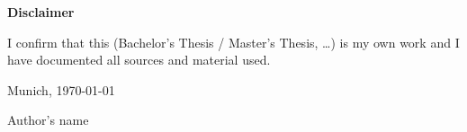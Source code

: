 \cleardoublepage{}

\thispagestyle{empty}

\vspace*{0.5\textheight}
\noindent

\makeatletter

\begin{center}
    {\textbf{Disclaimer}}
\end{center}

\begin{flushleft}
    {I confirm that this (Bachelor's Thesis / Master's Thesis, \ldots) is my own work and I have documented all sources and material used.}

    \makeatother

    \vspace{15mm}
    \noindent

    Munich, \today{}

    Author's name
\end{flushleft}

\cleardoublepage{}